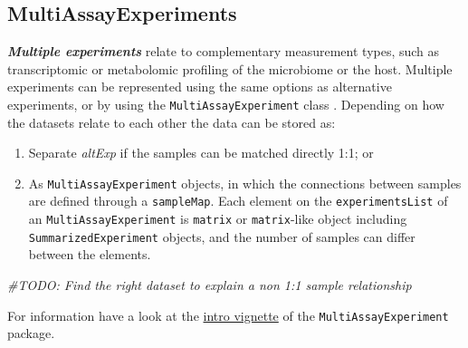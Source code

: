 \documentclass[
]{book}
\newenvironment{Shaded}{\begin{snugshade}}{\end{snugshade}}
\newcommand{\CommentTok}[1]{\textcolor[rgb]{0.56,0.35,0.01}{\textit{#1}}}
\providecommand{\tightlist}{%
  \setlength{\itemsep}{0pt}\setlength{\parskip}{0pt}}
\begin{document}
\hypertarget{multiassayexperiments}{%
\subsection{MultiAssayExperiments}\label{multiassayexperiments}}

\emph{\textbf{Multiple experiments}} relate to complementary measurement types,
such as transcriptomic or metabolomic profiling of the microbiome or
the host. Multiple experiments can be represented using the same
options as alternative experiments, or by using the
\texttt{MultiAssayExperiment} class \citep{R-MultiAssayExperiment}. Depending on how the
datasets relate to each other the data can be stored as:

\begin{enumerate}
\def\labelenumi{\arabic{enumi}.}
\tightlist
\item
  Separate \emph{altExp} if the samples can be matched directly 1:1; or
\item
  As \texttt{MultiAssayExperiment} objects, in which the connections between
  samples are defined through a \texttt{sampleMap}. Each element on the
  \texttt{experimentsList} of an \texttt{MultiAssayExperiment} is \texttt{matrix} or
  \texttt{matrix}-like object including \texttt{SummarizedExperiment} objects, and the
  number of samples can differ between the elements.
\end{enumerate}

\begin{Shaded}
\begin{Highlighting}[]
\CommentTok{\#TODO: Find the right dataset to explain a non 1:1 sample relationship}
\end{Highlighting}
\end{Shaded}

For information have a look at the \href{https://bioconductor.org/packages/release/bioc/vignettes/MultiAssayExperiment/inst/doc/MultiAssayExperiment.html}{intro vignette} of the \texttt{MultiAssayExperiment} package.
\end{document}
